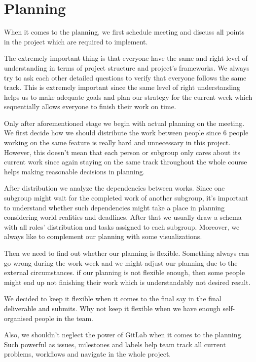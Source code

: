 \section{Planning}

When it comes to the planning, we first schedule meeting and discuss all points in the project which are required to implement.

The extremely important thing is that everyone have the same and right level of understanding in terms of project structure and project's frameworks.
We always try to ask each other detailed questions to verify that everyone follows the same track.
This is extremely important since the same level of right understanding helps us to make adequate goals and
plan our strategy for the current week which sequentially allows everyone to finish their work on time.

Only after aforementioned stage we begin with actual planning on the meeting.
We first decide how we should distribute the work between people since 6 people working on the same feature is really hard and unnecessary in this project.
However, this doesn't mean that each person or subgroup only cares about its current work since again staying
on the same track throughout the whole course helps making reasonable decisions in planning.

After distribution we analyze the dependencies between works. Since one subgroup might wait for the completed work of another subgroup,
it's important to understand whether such dependencies might take a place in planning considering world realities and deadlines.
After that we usually draw a schema with all roles' distribution and tasks assigned to each subgroup.
Moreover, we always like to complement our planning with some visualizations.

Then we need to find out whether our planning is flexible.
Something always can go wrong during the work week and we might adjust our planning due to the external circumstances.
if our planning is not flexible enough, then some people might end up not finishing their work which is understandably not desired result.

We decided to keep it flexible when it comes to the final say in the final deliverable and submits. Why not keep it flexible
when we have enough self-organised people in the team.

Also, we shouldn't neglect the power of GitLab when it comes to the planning. Such powerful as issues, milestones and labels
help team track all current problems, workflows and navigate in the whole project.